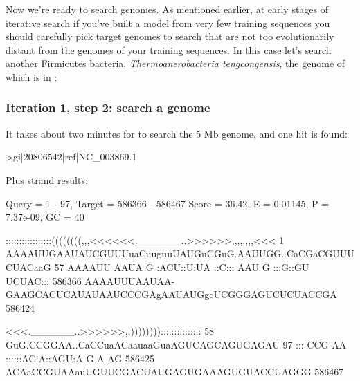 Now we're ready to search genomes. As mentioned earlier, at early
stages of iterative search if you've built a model from very few
training sequences you should carefully pick target genomes to search that are
not too evolutionarily distant from the genomes of your training
sequences. In this case let's search another Firmicutes bacteria,
\emph{Thermoanerobacteria tengcongensis}, the genome of which is in \newline
{}:

\subsubsection{Iteration 1, step 2: search a genome}

It takes about two minutes for  to search the 5 Mb
genome, and one hit is found:

\begin{sreoutput}
>gi|20806542|ref|NC_003869.1|

  Plus strand results:

 Query = 1 - 97, Target = 586366 - 586467
 Score = 36.42, E = 0.01145, P = 7.37e-09, GC =  40

           :::::::::::::::::((((((((,,,<<<<<<.______..>>>>>>,,,,,,,,<<<
         1 AAAAUUGAAUAUCGUUUuaCuuguuUAUGuCGuG.AAUUGG..CaCGaCGUUUCUACaaG 57      
           AAAAUU AAUA  G   :ACU::U:UA ::C::: AAU  G  :::G::GU UCUAC:::
    586366 AAAAUUUAAUAA-GAAGCACUCAUAUAAUCCCGAgAAUAUGgcUCGGGAGUCUCUACCGA 586424  

           <<<.______..>>>>>>,,)))))))):::::::::::::::
        58 GuG.CCGGAA..CaCCuaACaauaaGuaAGUCAGCAGUGAGAU 97      
           ::: CCG AA  ::::::AC:A::AGU:A    G A   AG  
    586425 ACAaCCGUAAauUGUUCGACUAUGAGUGAAAGUGUACCUAGGG 586467  
\end{sreoutput}

